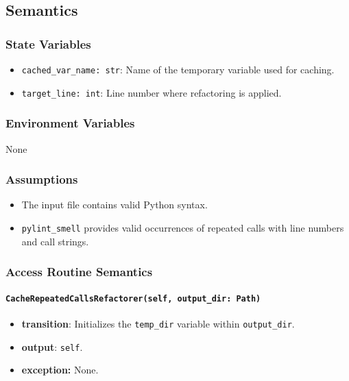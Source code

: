 \documentclass[12pt, titlepage]{article}
\begin{document}
\subsection{Semantics}

\subsubsection{State Variables}
\begin{itemize}
  \item \texttt{cached\_var\_name: str}: Name of the temporary variable used for caching.
  \item \texttt{target\_line: int}: Line number where refactoring is applied.
\end{itemize}

\subsubsection{Environment Variables}
None

\subsubsection{Assumptions}
\begin{itemize}
  \item The input file contains valid Python syntax.
  \item \texttt{pylint\_smell} provides valid occurrences of repeated calls with line numbers and call strings.
\end{itemize}

\subsubsection{Access Routine Semantics}

\paragraph{\texttt{CacheRepeatedCallsRefactorer(self, output\_dir: Path)}}
\begin{itemize}
  \item \textbf{transition}: Initializes the \texttt{temp\_dir} variable within \texttt{output\_dir}.
  \item \textbf{output}: \texttt{self}.
  \item \textbf{exception:} None.
\end{itemize}
\end{document}
